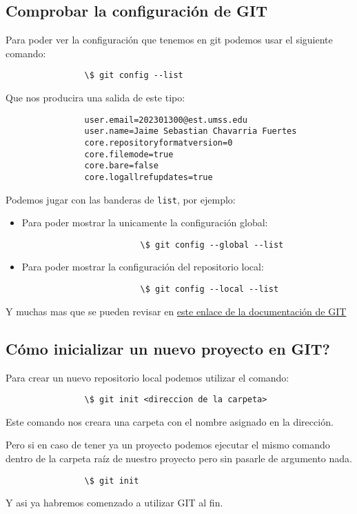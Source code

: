     \subsection{Comprobar la configuraci\'on de GIT}
        Para poder ver la configuraci\'on que tenemos en git podemos usar el siguiente comando:
            \begin{lstlisting}
                \$ git config --list
            \end{lstlisting}
        Que nos producira una salida de este tipo:
            \begin{lstlisting}
                user.email=202301300@est.umss.edu
                user.name=Jaime Sebastian Chavarria Fuertes
                core.repositoryformatversion=0
                core.filemode=true
                core.bare=false
                core.logallrefupdates=true
            \end{lstlisting}
        Podemos jugar con las banderas de \texttt{list}, por ejemplo:
            \begin{itemize}
                \item Para poder mostrar la unicamente la configuraci\'on global:
                    \begin{lstlisting}
                        \$ git config --global --list
                    \end{lstlisting}
                \item Para poder mostrar la configuraci\'on del repositorio local:
                    \begin{lstlisting}
                        \$ git config --local --list
                    \end{lstlisting}
            \end{itemize}
        Y muchas mas que se pueden revisar en \href{https://git-scm.com/docs/git-config}{este enlace de la documentaci\'on de GIT}
    
    \subsection{C\'omo inicializar un nuevo proyecto en GIT?}
        Para crear un nuevo repositorio local podemos utilizar el comando:
            \begin{lstlisting}
                \$ git init <direccion de la carpeta>
            \end{lstlisting}
        Este comando nos creara una carpeta con el nombre asignado en la direcci\'on.

        Pero si en caso de tener ya un proyecto podemos ejecutar el mismo comando dentro de la carpeta ra\'iz de nuestro proyecto pero sin pasarle de argumento nada.
            \begin{lstlisting}
                \$ git init
            \end{lstlisting}
        Y asi ya habremos comenzado a utilizar GIT al fin.